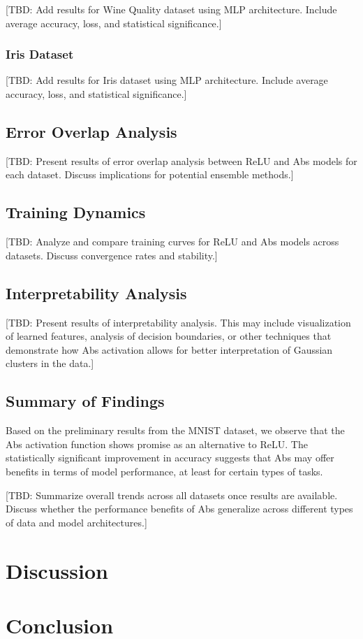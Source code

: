 \documentclass[11pt]{article}
\begin{document}
[TBD: Add results for Wine Quality dataset using MLP architecture. Include average accuracy, loss, and statistical significance.]

\subsubsection{Iris Dataset}

[TBD: Add results for Iris dataset using MLP architecture. Include average accuracy, loss, and statistical significance.]

\subsection{Error Overlap Analysis}

[TBD: Present results of error overlap analysis between ReLU and Abs models for each dataset. Discuss implications for potential ensemble methods.]

\subsection{Training Dynamics}

[TBD: Analyze and compare training curves for ReLU and Abs models across datasets. Discuss convergence rates and stability.]

\subsection{Interpretability Analysis}

[TBD: Present results of interpretability analysis. This may include visualization of learned features, analysis of decision boundaries, or other techniques that demonstrate how Abs activation allows for better interpretation of Gaussian clusters in the data.]

\subsection{Summary of Findings}

Based on the preliminary results from the MNIST dataset, we observe that the Abs activation function shows promise as an alternative to ReLU. The statistically significant improvement in accuracy suggests that Abs may offer benefits in terms of model performance, at least for certain types of tasks.

[TBD: Summarize overall trends across all datasets once results are available. Discuss whether the performance benefits of Abs generalize across different types of data and model architectures.]

\section{Discussion}


\section{Conclusion}




\end{document}
